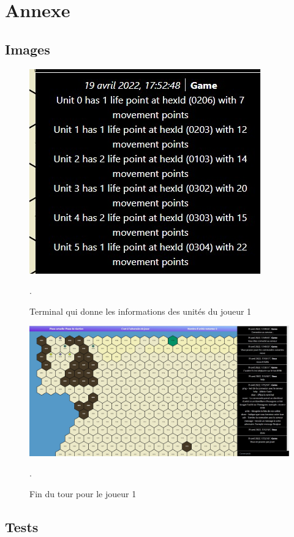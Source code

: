 \section{Annexe}

\subsection{Images}
\begin{figure}[H]
    \centering
    \includegraphics[scale=0.6]{data/info_units.jpg}
    \caption{Terminal qui donne les informations des unités du joueur 1 }.
    \label{fig:units_command}
\end{figure}

\begin{figure}[H]
    \centering
    \includegraphics[scale=0.35]{data/fin_tour.jpg}
    \caption{Fin du tour pour le joueur 1}.
    \label{fig:fin_tour}
\end{figure}




\subsection{Tests}
\newpage


